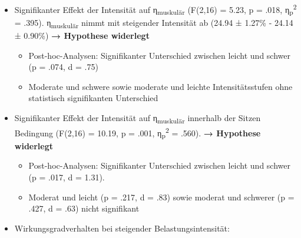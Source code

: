 \documentclass[
  letterpaper,
  DIV=11]{scrartcl}
\providecommand{\tightlist}{%
  \setlength{\itemsep}{0pt}\setlength{\parskip}{0pt}}\usepackage{longtable,booktabs,array}
\begin{document}
\begin{itemize}
\item
  Signifikanter Effekt der Intensität auf η\textsubscript{muskulär}
  (F(2,16) = 5.23, p = .018, η\textsubscript{p}\textsuperscript{2} =
  .395). η\textsubscript{muskulär} nimmt mit steigender Intensität ab
  (24.94 ± 1.27\% - 24.14 ± 0.90\%) \textbf{→ Hypothese widerlegt}

  \begin{itemize}
  \tightlist
  \item
    Post-hoc-Analysen: Signifikanter Unterschied zwischen leicht und
    schwer (p = .074, d = .75)
  \item
    Moderate und schwere sowie moderate und leichte Intensitätsstufen
    ohne statistisch signifikanten Unterschied
  \end{itemize}
\item
  Signifikanter Effekt der Intensität auf η\textsubscript{muskulär}
  innerhalb der Sitzen Bedingung (F(2,16) = 10.19, p = .001,
  η\textsubscript{p}\textsuperscript{2} = .560). \textbf{→ Hypothese
  widerlegt}

  \begin{itemize}
  \tightlist
  \item
    Post-hoc-Analysen: Signifikanter Unterschied zwischen leicht und
    schwer (p = .017, d = 1.31).
  \item
    Moderat und leicht (p = .217, d = .83) sowie moderat und schwerer (p
    = .427, d = .63) nicht signifikant
  \end{itemize}
\item
  Wirkungsgradverhalten bei steigender Belastungsintensität:


\end{itemize}
\end{document}
